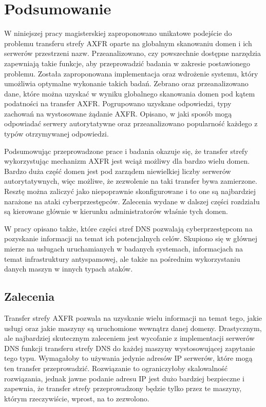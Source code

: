 \chapter{Podsumowanie}
\noindent W niniejszej pracy magisterskiej zaproponowano unikatowe podejście do problemu transferu strefy AXFR oparte na globalnym skanowaniu
domen i ich serwerów przestrzeni nazw. Przeanalizowano, czy powszechnie dostępne narzędzia zapewniają takie funkcje, aby przeprowadzić
badania w zakresie postawionego problemu. Została zaproponowana implementacja oraz wdrożenie systemu, który umożliwia optymalne wykonanie
takich badań. Zebrano oraz przeanalizowano dane, które można uzyskać w wyniku globalnego skanowania domen pod kątem podatności
na transfer AXFR. Pogrupowano uzyskane odpowiedzi, typy zachowań na wystosowane żądanie AXFR. Opisano, w jaki sposób mogą odpowiadać
serwery autorytatywne oraz przeanalizowano popularność każdego z typów otrzymywanej odpowiedzi.

Podsumowując przeprowadzone prace i badania okazuje się, że transfer strefy wykorzystując mechanizm AXFR jest wciąż możliwy dla
bardzo wielu domen. Bardzo duża część domen jest pod zarządem niewielkiej liczby serwerów autorytatywnych, więc możliwe, że zezwolenie
na taki transfer bywa zamierzone. Resztę można zaliczyć jako niepoprawnie skonfigurowane i to one są najbardziej narażone na
ataki cyberprzestępców. Zalecenia wydane w dalszej części rozdziału są kierowane głównie w kierunku administratorów właśnie tych domen.

W pracy opisano także, które części stref DNS pozwalają cyberprzestępcom na pozyskanie informacji na temat ich potencjalnych celów.
Skupiono się w głównej mierze na usługach uruchamianych w badanych systemach, informacjach na temat infrastruktury antyspamowej,
ale także na pośrednim wykorzystaniu danych maszyn w innych typach ataków.

\section{Zalecenia}
\noindent Transfer strefy AXFR pozwala na uzyskanie wielu informacji na temat tego, jakie usługi oraz jakie maszyny są uruchomione wewnątrz danej
domeny. Drastycznym, ale najbardziej skutecznym zaleceniem jest wycofanie z implementacji serwerów DNS funkcji transferu strefy DNS do
każdej maszyny wystosowującej zapytanie tego typu. Wymagałoby to używania jedynie adresów IP serwerów, które mogą ten transfer przeprowadzić.
Rozwiązanie to ograniczyłoby skalowalność rozwiązania, jednak jawne podanie adresu IP jest dużo bardziej bezpieczne i zapewnia, że
transfer strefy przeprowadzony będzie tylko przez te maszyny, którym rzeczywiście, wprost, na to zezwolono.

